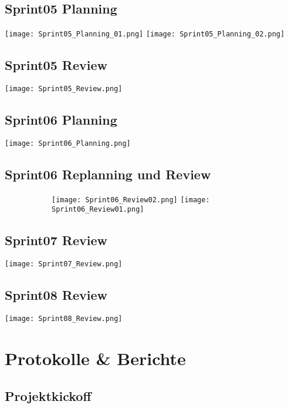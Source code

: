 \newpage
\section*{Sprint05 Planning}
\texttt{[image: Sprint05\_Planning\_01.png]}
\newpage
\noindent
\texttt{[image: Sprint05\_Planning\_02.png]}

\newpage
\section*{Sprint05 Review}
\texttt{[image: Sprint05\_Review.png]}

\newpage
\section*{Sprint06 Planning}
\texttt{[image: Sprint06\_Planning.png]}

\newpage
\section*{Sprint06 Replanning und Review}

\begin{figure}[h!]
	\begin{subfigure}{\linewidth}
		\texttt{[image: Sprint06\_Review02.png]}
		\texttt{[image: Sprint06\_Review01.png]}
	\end{subfigure}
\end{figure}

\newpage
\section*{Sprint07 Review}
\texttt{[image: Sprint07\_Review.png]}

\newpage
\section*{Sprint08 Review}
\texttt{[image: Sprint08\_Review.png]}

\chapter{Protokolle \& Berichte}
\section{Projektkickoff}
\label{app:sec:protokollKickoff}


